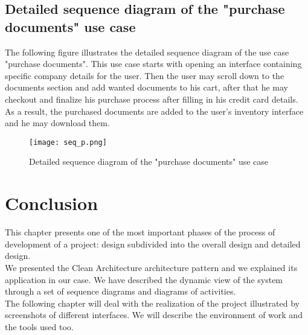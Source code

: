 \subsection{Detailed sequence diagram of the "purchase documents" use case}
The following figure illustrates the detailed sequence diagram of the use case
"purchase documents".
This use case starts with opening an interface containing specific company details for the user. Then the user may scroll down to the documents section and add wanted documents to his cart, after that he may checkout and finalize his purchase process after filling in his credit card details. As a result, the purchased documents are added to the user's inventory interface and he may download them.
\begin{figure}[H]%
    \center   
    \texttt{[image: seq\_p.png]}
    \caption{Detailed sequence diagram of the "purchase documents" use case}
\end{figure}
\section*{Conclusion}
This chapter presents one of the most important phases of the process of
development of a project: design subdivided into the overall design
and detailed design.\\
We presented the Clean Architecture architecture pattern and we
explained its application in our case. We have described the dynamic view
of the system through a set of sequence diagrams and diagrams
of activities.\\
The following chapter will deal with the realization of the project illustrated by screenshots of different interfaces. We will describe the environment of
work and the tools used too.
